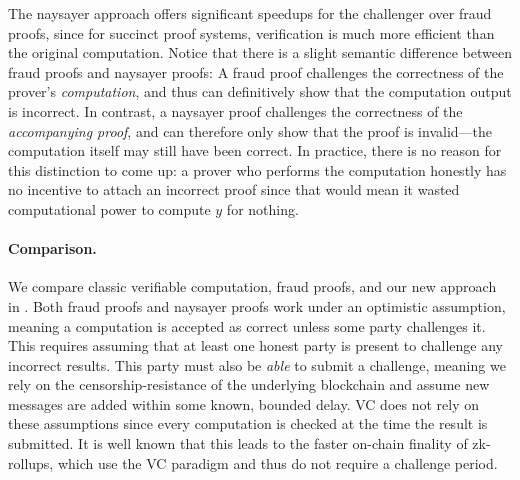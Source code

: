 
The naysayer approach offers significant speedups for the challenger over fraud proofs, since for succinct proof systems, verification is much more efficient than the original computation. 
Notice that there is a slight semantic difference between fraud proofs and naysayer proofs: A fraud proof challenges the correctness of the prover's \emph{computation}, and thus can definitively show that the computation output is incorrect. In contrast, a naysayer proof challenges the correctness of the \emph{accompanying proof}, and can therefore only show that the proof is invalid---the computation itself may still have been correct. In practice, there is no reason for this distinction to come up: a prover who performs the computation honestly has no incentive to attach an incorrect proof since that would mean it wasted computational power to compute $y$ for nothing.





\paragraph{Comparison.} We compare classic verifiable computation, fraud proofs, and our new approach in . 
Both fraud proofs and naysayer proofs work under an optimistic assumption, meaning a computation is accepted as correct unless some party challenges it. This requires assuming that at least one honest party is present to challenge any incorrect results. This party must also be \emph{able} to submit a challenge, meaning we rely on the censorship-resistance of the underlying blockchain and assume new messages are added within some known, bounded delay. VC does not rely on these assumptions since every computation is checked at the time the result is submitted. It is well known that this leads to the faster on-chain finality of zk-rollups, which use the VC paradigm and thus do not require a challenge period.

